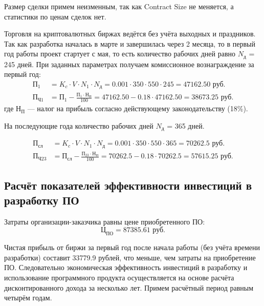 Размер сделки примем неизменным, так как Contract Size не меняется, а статистики по ценам сделок нет.

Торговля на криптовалютных биржах ведётся без учёта выходных и праздников. Так как разработка началась в марте и завершилась через 2 месяца, то в первый год работы проект стартует с мая, то есть количество рабочих дней равно $N_\textit{д}$ = 245 дней. При заданных параметрах получаем комиссионное вознаграждение за первый год:
\begin{align*}
    \textit{П}_1 &= K_c \cdot V \cdot N_1 \cdot N_\textit{д} = 0.001 \cdot 350 \cdot 550 \cdot 245 = 47162.50 \textrm{ руб.} \\
    \textit{П}_\textit{Ч1} &= \textit{П}_1 - \frac{\textit{П}_1 \cdot \textit{Н}_\textit{П}}{100} = 47162.50 - 0.18 \cdot 47162.50 = 38673.25 \textrm{ руб.}
\end{align*}
где $\textit{Н}_\textit{П}$ — налог на прибыль согласно действующему законодательству (18\%).

На последующие года количество рабочих дней $N_\textit{д}$ = 365 дней.

\begin{align*}
    \textit{П}_{сл} &= K_c \cdot V \cdot N_1 \cdot N_\textit{д} = 0.001 \cdot 350 \cdot 550 \cdot 365 = 70262.5 \textrm{ руб.} \\
    \textit{П}_\textit{Ч23} &= \textit{П}_\textit{сл} - \frac{\textit{П}_{23} \cdot \textit{Н}_\textit{П}}{100} = 70262.5 - 0.18 \cdot 70262.5 = 57615.25 \textrm{ руб.}
\end{align*}

\subsection{Расчёт показателей эффективности инвестиций в разработку ПО}

Затраты организации-заказчика равны цене приобретенного ПО:
\begin{equation}
    \textit{Ц}_\textit{ПО} = 87385.61 \textrm{ руб.}
\end{equation}

Чистая прибыль от биржи за первый год после начала работы (без учёта времени разработки) составит 33779.9 рублей, что меньше, чем затраты на приобретение ПО. Следовательно экономическая эффективность инвестиций в разработку и использование программного продукта осуществляется на основе расчёта дисконтированного дохода за несколько лет. Примем расчётный период равным четырём годам.

